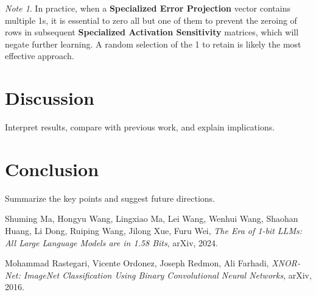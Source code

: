 \documentclass{article}
\theoremstyle{definition}
\theoremstyle{remark}
\newtheorem*{note}{Note}
\begin{document}
\begin{note}
    In practice, when a \textbf{Specialized Error Projection} vector contains multiple 1s, it is essential to zero all but one of them to prevent the zeroing of rows in subsequent \textbf{Specialized Activation Sensitivity} matrices, which will negate further learning. A random selection of the 1 to retain is likely the most effective approach.
\end{note}

\section{Discussion}
Interpret results, compare with previous work, and explain implications.

\section{Conclusion}
Summarize the key points and suggest future directions.

\begin{thebibliography}{9}

    Shuming Ma, Hongyu Wang, Lingxiao Ma, Lei Wang, Wenhui Wang, Shaohan Huang, Li Dong, Ruiping Wang, Jilong Xue, Furu Wei, \textit{The Era of 1-bit LLMs: All Large Language Models are in 1.58 Bits}, arXiv, 2024.

    Mohammad Rastegari, Vicente Ordonez, Joseph Redmon, Ali Farhadi, \textit{XNOR-Net: ImageNet Classification Using Binary Convolutional Neural Networks}, arXiv, 2016.

\end{thebibliography}
\end{document}
